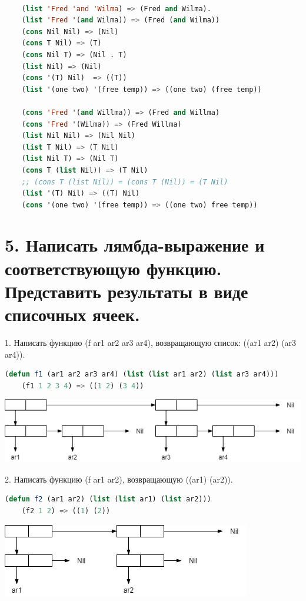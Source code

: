 \documentclass[12pt]{report}
\begin{document}
\begin{lstlisting}[language=Lisp]

	(list 'Fred 'and 'Wilma) => (Fred and Wilma). 
	(list 'Fred '(and Wilma)) => (Fred (and Wilma))
	(cons Nil Nil) => (Nil)
	(cons T Nil) => (T)
	(cons Nil T) => (Nil . T)
	(list Nil) => (Nil)
	(cons '(T) Nil)	 => ((T))
	(list '(one two) '(free temp)) => ((one two) (free temp))
	
	(cons 'Fred '(and Willma)) => (Fred and Willma)
	(cons 'Fred '(Wilma)) => (Fred Willma)
	(list Nil Nil) => (Nil Nil)
	(list T Nil) => (T Nil)
	(list Nil T) => (Nil T)
	(cons T (list Nil)) => (T Nil)
	;; (cons T (list Nil)) = (cons T (Nil))	= (T Nil)
	(list '(T) Nil) => ((T) Nil)
	(cons '(one two) '(free temp)) => ((one two) free temp))
\end{lstlisting}

\section*{5. Написать лямбда-выражение и соответствующую функцию. Представить результаты в виде списочных ячеек.}


1. Написать функцию (f ar1 ar2 ar3 ar4), возвращающую список: ((ar1 ar2) (ar3 ar4)).
\begin{lstlisting}[language=Lisp]
	(defun f1 (ar1 ar2 ar3 ar4) (list (list ar1 ar2) (list ar3 ar4)))
	(f1 1 2 3 4) => ((1 2) (3 4))
\end{lstlisting}

\includegraphics[scale=0.7]{img/1}

2. Написать функцию (f ar1 ar2), возвращающую ((ar1) (ar2)).
\begin{lstlisting}[language=Lisp]
	(defun f2 (ar1 ar2) (list (list ar1) (list ar2)))
	(f2 1 2) => ((1) (2))
\end{lstlisting}

\includegraphics[scale=0.7]{img/2}
\end{document}
